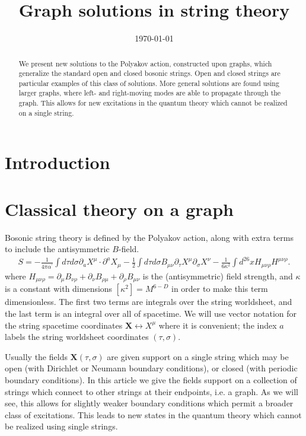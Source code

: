 \documentclass{revtex4}
\newcommand{\be}{\begin{eqnarray}}
\newcommand{\ee}{\end{eqnarray}}
\def\X{\bm{X}}
\begin{document}
\title{Graph solutions in string theory}
\date{\today}

\begin{abstract}
We present new solutions to the Polyakov action, constructed upon graphs, which generalize the standard open and closed bosonic strings. Open and closed strings are particular examples of this class of solutions. More general solutions are found using larger graphs, where left- and right-moving modes are able to propagate through the graph. This allows for new excitations in the quantum theory which cannot be realized on a single string.
\end{abstract}

\maketitle

\section{Introduction}

\section{Classical theory on a graph}
Bosonic string theory is defined by the Polyakov action, along with extra terms to include the antisymmetric $B$-field.
\be
\label{poly action}
S = - \frac{1}{4 \pi \alpha^\prime} \int d\tau d\sigma \partial_a X^\mu \cdot \partial^a X_\mu 
- \frac{1}{2} \int d\tau d\sigma B_{\mu \nu} \partial_\tau X^\mu \partial_\sigma X^\nu
- \frac{1}{6 \kappa^2} \int d^{26} x H_{\mu \nu \rho} H^{\mu \nu \rho} .
\ee
where $H_{\mu \nu \rho} = \partial_\mu B_{\nu \rho} +  \partial_\nu B_{\rho \mu}+ \partial_\rho B_{\mu \nu}$ is the (antisymmetric) field strength, and $\kappa$ is a constant with dimensions $[\kappa^2] = M^{6-D}$ in order to make this term dimensionless. The first two terms are integrals over the string worldsheet, and the last term is an integral over all of spacetime.
We will use vector notation for the string spacetime coordinates $\X \leftrightarrow X^\mu$ where it is convenient; the index $a$ labels the string worldsheet coordinates $(\tau, \sigma)$.

Usually the fields $\X(\tau, \sigma)$ are given support on a single string which may be open (with Dirichlet or Neumann boundary conditions), or closed (with periodic boundary conditions). In this article we give the fields support on a collection of strings which connect to other strings at their endpoints, i.e. a graph. As we will see, this allows for slightly weaker boundary conditions which permit a broader class of excitations. This leads to new states in the quantum theory which cannot be realized using single strings.
\end{document}

